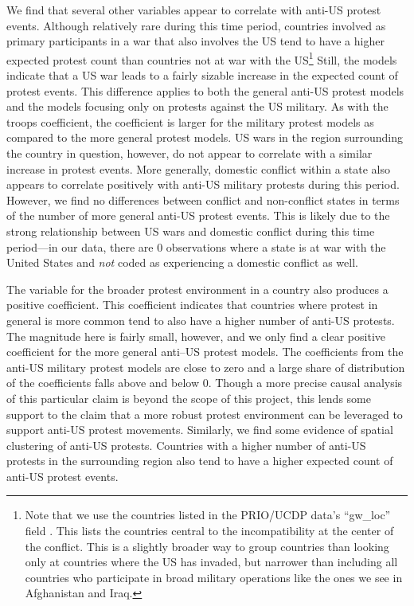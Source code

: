 We find that several other variables appear to correlate with anti-US protest events. Although relatively rare during this time period, countries involved as primary participants in a war that also involves the US tend to have a higher expected protest count than countries not at war with the US\footnote{Note that we use the countries listed in the PRIO/UCDP data's ``gw\_loc'' field \cite{Gleditschetal2002,Pettersson2019}. This lists the countries central to the incompatibility at the center of the conflict. This is a slightly broader way to group countries than looking only at countries where the US has invaded, but narrower than including all countries who participate in broad military operations like the ones we see in Afghanistan and Iraq.} Still, the models indicate that a US war leads to a fairly sizable increase in the expected count of protest events. This difference applies to both the general anti-US protest models and the models focusing only on protests against the US military. As with the troops coefficient, the coefficient is larger for the military protest models as compared to the more general protest models. US wars in the region surrounding the country in question, however, do not appear to correlate with a similar increase in protest events. More generally, domestic conflict within a state also appears to correlate positively with anti-US military protests during this period. However, we find no differences between conflict and non-conflict states in terms of the number of more general anti-US protest events. This is likely due to the strong relationship between US wars and domestic conflict during this time period---in our data, there are 0 observations where a state is at war with the United States and \textit{not} coded as experiencing a domestic conflict as well. 

The variable for the broader protest environment in a country also produces a positive coefficient. This coefficient indicates that countries where protest in general is more common tend to also have a higher number of anti-US protests. The magnitude here is fairly small, however, and we only find a clear positive coefficient for the more general anti--US protest models. The coefficients from the anti-US military protest models are close to zero and a large share of distribution of the coefficients falls above and below 0. Though a more precise causal analysis of this particular claim is beyond the scope of this project, this lends some support to the claim that a more robust protest environment can be leveraged to support anti-US protest movements. Similarly, we find some evidence of spatial clustering of anti-US protests. Countries with a higher number of anti-US protests in the surrounding region also tend to have a higher expected count of anti-US protest events.


